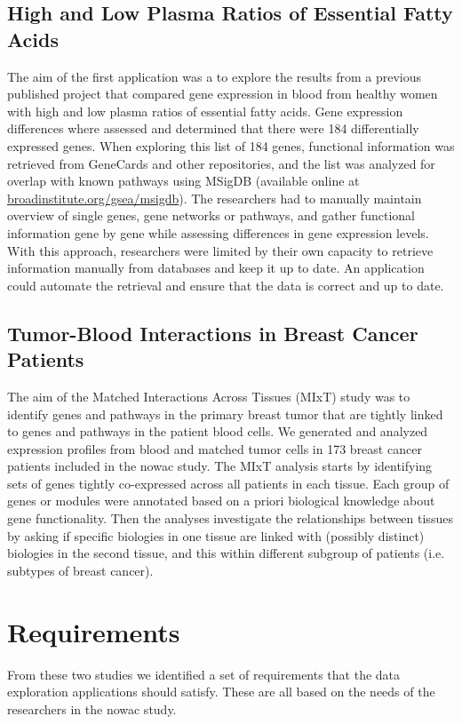 \subsection{High and Low Plasma Ratios of Essential Fatty Acids} 
The aim of the first application was a to explore the results from a previous
published project that compared gene expression in blood from healthy women with
high and low plasma ratios of essential fatty acids.\cite{olsen2013plasma}  Gene
expression differences where assessed and determined that there were 184
differentially expressed genes. When exploring this list of 184 genes,
functional information was retrieved from GeneCards and other repositories, and
the list was analyzed for overlap with known pathways using MSigDB (available
online at
\href{broadinstitute.org/gsea/msigdb}{broadinstitute.org/gsea/msigdb}). The
researchers had to manually maintain overview of single genes, gene networks or
pathways, and gather functional information gene by gene while assessing
differences in gene expression levels. With this approach, researchers were
limited by their own capacity to retrieve information manually from databases
and keep it up to date. An application could automate the retrieval and ensure
that the data is correct and up to date. 

\subsection{Tumor-Blood Interactions in Breast Cancer Patients}
The aim of the Matched Interactions Across Tissues (MIxT) study was to identify
genes and pathways in the primary breast tumor that are tightly linked to genes
and pathways in the patient blood cells.\cite{dumeaux2017interactions} We
generated and analyzed expression profiles from blood and matched tumor cells in
173 breast cancer patients included in the \gls{nowac} 
study.  The MIxT analysis starts by identifying sets of genes tightly
co-expressed across all patients in each tissue. Each group of genes or modules
were annotated based on a priori biological knowledge about gene functionality.
Then the analyses investigate the relationships between tissues by asking if
specific biologies in one tissue are linked with (possibly distinct) biologies
in the second tissue, and this within different subgroup of patients (i.e.
subtypes of breast cancer).

\section{Requirements} 
From these two studies we identified a set of requirements that the data
exploration applications should satisfy. These are all based on the needs of the
researchers in the \gls{nowac} study. 

